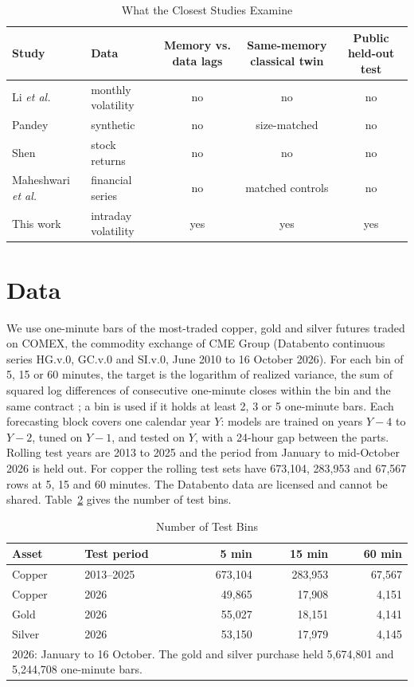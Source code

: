\documentclass{ieeeaccess}
\begin{document}
\begin{table}[t]
\caption{What the Closest Studies Examine}
\label{tab:closest}
\centering
\begin{tabular}{p{1.55cm}p{1.45cm}ccc}
\hline
Study & Data & Memory vs. data lags & Same-memory classical twin & Public held-out test \\
\hline
Li \emph{et al.} \cite{li2026} & monthly volatility & no & no & no \\
Pandey \cite{pandey2026} & synthetic & no & size-matched & no \\
Shen \cite{shen2026} & stock returns & no & no & no \\
Maheshwari \emph{et al.} \cite{maheshwari2026b} & financial series & no & matched controls & no \\
This work & intraday volatility & yes & yes & yes \\
\hline
\end{tabular}
\end{table}

\section{Data}
\label{sec:data}
We use one-minute bars of the most-traded copper, gold and silver futures traded on COMEX, the commodity exchange of CME Group (Databento continuous series HG.v.0, GC.v.0 and SI.v.0, June 2010 to 16 October 2026). For each bin of 5, 15 or 60 minutes, the target is the logarithm of realized variance, the sum of squared log differences of consecutive one-minute closes within the bin and the same contract \cite{andersen2003}; a bin is used if it holds at least 2, 3 or 5 one-minute bars. Each forecasting block covers one calendar year $Y$: models are trained on years $Y-4$ to $Y-2$, tuned on $Y-1$, and tested on $Y$, with a 24-hour gap between the parts. Rolling test years are 2013 to 2025 and the period from January to mid-October 2026 is held out. For copper the rolling test sets have 673,104, 283,953 and 67,567 rows at 5, 15 and 60 minutes. The Databento data are licensed and cannot be shared. Table~\ref{tab:samples} gives the number of test bins.

\begin{table}[t]
\caption{Number of Test Bins}
\label{tab:samples}
\centering
\begin{tabular}{llrrr}
\hline
Asset & Test period & 5 min & 15 min & 60 min \\
\hline
Copper & 2013--2025 & 673,104 & 283,953 & 67,567 \\
Copper & 2026 & 49,865 & 17,908 & 4,151 \\
Gold & 2026 & 55,027 & 18,151 & 4,141 \\
Silver & 2026 & 53,150 & 17,979 & 4,145 \\
\hline
\multicolumn{5}{p{7.6cm}}{\footnotesize 2026: January to 16 October. The gold and silver purchase held 5,674,801 and 5,244,708 one-minute bars.}\\
\end{tabular}
\end{table}
\end{document}
